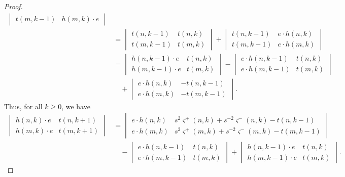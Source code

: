 \begin{proof}
\begin{align*}
\begin{vmatrix}
t(m, k-1) & h(m, k) \cdot e
\end{vmatrix} \\
&= 
\begin{vmatrix}
t(n, k-1) & t(n, k) \\
t(m, k-1) & t(m, k)
\end{vmatrix} 
+
\begin{vmatrix}
t(n, k-1) & e \cdot h(n, k) \\
t(m, k-1) & e \cdot h(m, k)
\end{vmatrix} \\
&=
\begin{vmatrix}
h(n, k-1) \cdot e & t(n, k) \\
h(m, k-1) \cdot e & t(m, k)
\end{vmatrix} 
- 
\begin{vmatrix}
e \cdot h(n, k-1) & t(n, k) \\
e \cdot h(m, k-1) & t(m, k)
\end{vmatrix} \\
& \quad +
\begin{vmatrix}
e \cdot h(n, k) & - t(n, k-1) \\
e \cdot h(m, k) & - t(m, k-1)
\end{vmatrix}.
\end{align*}
Thus, for all $k \geq 0$, we have
\begin{equation}\label{eq:detgymnastics5}
\begin{split}
\begin{vmatrix}
h(n, k) \cdot e & t(n, k+1) \\
h(m, k) \cdot e & t(m, k+1)
\end{vmatrix}
&=
\begin{vmatrix}
e \cdot h(n, k) & s^2 \varsigma^+ (n, k) + s^{-2} \varsigma^- (n, k) - t(n, k-1) \\
e \cdot h(m, k) & s^2 \varsigma^+ (m, k) + s^{-2} \varsigma^- (m, k) - t(m, k-1)
\end{vmatrix} \\
& \quad -
\begin{vmatrix}
e \cdot h(n, k-1) & t(n, k) \\
e \cdot h(m, k-1) & t(m, k)
\end{vmatrix} 
+
\begin{vmatrix}
h(n, k-1) \cdot e & t(n, k) \\
h(m, k-1) \cdot e & t(m, k)
\end{vmatrix}.
\end{split}
\end{equation}

\end{proof}
